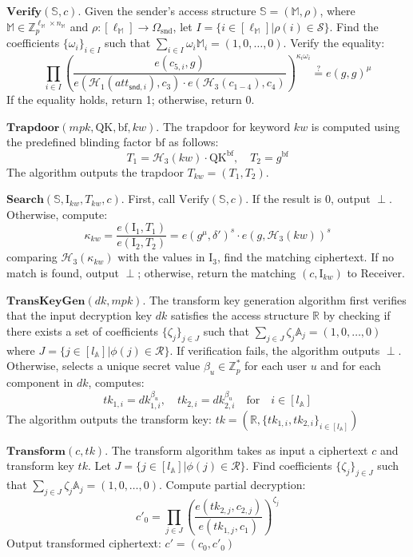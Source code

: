 \documentclass[runningheads]{llncs}
\begin{document}
$\mathbf{Verify}(\mathbb{S}, c).$ Given the sender's access structure $ \mathbb{S} = (\mathbb{M}, \rho) $, where $ \mathbb{M} \in \mathbb{Z}_p^{\ell_\mathbb{M} \times n_\mathbb{M}} $ and $ \rho: [\ell_\mathbb{M}] \rightarrow \Omega_{\text{snd}} $, let $ I = \{ i \in [\ell_\mathbb{M}] | \rho(i) \in \mathcal{S} \} $. Find the coefficients $ \{ \omega_i \}_{i \in I} $ such that $ \sum_{i \in I} \omega_i \mathbb{M}_i = (1, 0, \ldots, 0) $. Verify the equality:
$$
\prod_{i \in I} \left( \frac{e(c_{5,i}, g)}{e(\mathcal{H}_1(att_{\mathsf{snd},i}), c_3) \cdot e(\mathcal{H}_3(c_{1-4}), c_4)} \right)^{\kappa_i \omega_i} \overset{?}{=} e(g, g)^\mu
$$
If the equality holds, return 1; otherwise, return 0.

$\mathbf{Trapdoor}(mpk, \text{QK}, \text{bf}, kw).$ The trapdoor for keyword $kw$ is computed using the predefined blinding factor $ \text{bf} $ as follows:
$$T_1 = \mathcal{H}_3(kw) \cdot \text{QK}^{\text{bf}}, \quad T_2 = g^{\text{bf}}$$
The algorithm outputs the trapdoor $ T_{kw} = (T_1, T_2) $.

$\mathbf{Search}(\mathbb{S}, \text{I}_{kw}, T_{kw}, c)$. First, call $ \text{Verify}(\mathbb{S}, c) $. If the result is 0, output $ \perp $. Otherwise, compute:
$$
\kappa_{kw} = \frac{e(\text{I}_1, T_1)}{e(\text{I}_2, T_2)} = e(g^\mu, \delta')^s \cdot e(g, \mathcal{H}_3(kw))^s
$$
comparing $ \mathcal{H}_3(\kappa_{kw}) $ with the values in $ \text{I}_3 $, find the matching ciphertext. If no match is found, output $ \perp $; otherwise, return the matching $(c, \text{I}_{kw})$ to Receiver.

$\mathbf{TransKeyGen}(dk, mpk)$. The transform key generation algorithm first verifies that the input decryption key $dk$ satisfies the access structure $\mathbb{R}$ by checking if there exists a set of coefficients $\{\zeta_j\}_{j \in J}$ such that $\sum_{j \in J} \zeta_j \mathbb{A}_j = (1,0,\ldots,0)$ where $J = \{j \in [l_{\mathbb{A}}] | \phi(j) \in \mathcal{R}\}$. If verification fails, the algorithm outputs $\perp$. Otherwise, selects a unique secret value $\beta_u \in \mathbb{Z}_p^*$ for each user $u$ and for each component in $dk$, computes:
$$
tk_{1,i} = dk_{1,i}^{\beta_u},\quad tk_{2,i} = dk_{2,i}^{\beta_u} \quad \text{for} \quad i \in [l_\mathbb{A}]
$$
The algorithm outputs the transform key: $tk = (\mathbb{R}, \{tk_{1,i}, tk_{2,i}\}_{i \in [l_\mathbb{A}]})$

$\mathbf{Transform}(c, tk)$. The transform algorithm takes as input a ciphertext $c$ and transform key $tk$. Let $J = \{j \in [l_{\mathbb{A}}] | \phi(j) \in \mathcal{R}\}$. Find coefficients $\{\zeta_j\}_{j \in J}$ such that $\sum_{j \in J} \zeta_j \mathbb{A}_j = (1,0,\ldots,0)$. Compute partial decryption:
$$c'_0 = \prod_{j \in J} \left(\frac{e(tk_{2,j}, c_{2,j})}{e(tk_{1,j}, c_1)}\right)^{\zeta_j}$$
Output transformed ciphertext: $c' = (c_0, c'_0)$
\end{document}
